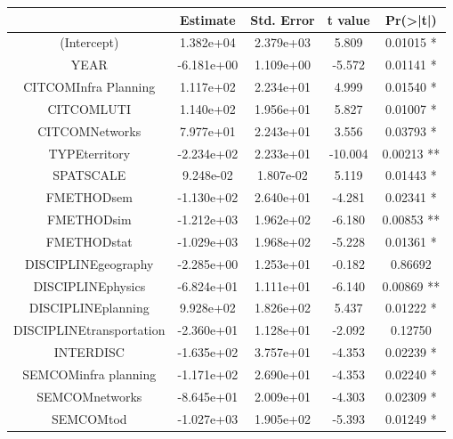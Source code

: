{\centering
\begin{tabular}{|c|c|c|c|c|}
\hline
 &     Estimate & Std. Error & t value & Pr(>|t|)   \\\hline
(Intercept)           &    1.382e+04 &  2.379e+03 &  5.809 & 0.01015 * \\
YEAR                   &  -6.181e+00 &  1.109e+00 & -5.572 & 0.01141 * \\
CITCOMInfra Planning   &   1.117e+02 &  2.234e+01 &  4.999 & 0.01540 * \\
CITCOMLUTI             &   1.140e+02 & 1.956e+01  & 5.827 & 0.01007 * \\
CITCOMNetworks         &   7.977e+01 & 2.243e+01 &  3.556 & 0.03793 * \\
TYPEterritory          &  -2.234e+02 & 2.233e+01 & -10.004 & 0.00213 ** \\
SPATSCALE              &   9.248e-02 & 1.807e-02 &  5.119 & 0.01443 * \\
FMETHODsem             &  -1.130e+02 & 2.640e+01 &  -4.281 & 0.02341 * \\
FMETHODsim             &  -1.212e+03 & 1.962e+02 & -6.180 & 0.00853 **\\
FMETHODstat            &  -1.029e+03 & 1.968e+02 & -5.228 & 0.01361 * \\
DISCIPLINEgeography    &  -2.285e+00 & 1.253e+01 & -0.182 & 0.86692   \\
DISCIPLINEphysics      &  -6.824e+01 & 1.111e+01 & -6.140 & 0.00869 **\\
DISCIPLINEplanning     &   9.928e+02 & 1.826e+02  & 5.437 & 0.01222 * \\
DISCIPLINEtransportation & -2.360e+01 & 1.128e+01 & -2.092 & 0.12750   \\
INTERDISC             &   -1.635e+02 & 3.757e+01 & -4.353 & 0.02239 * \\
SEMCOMinfra planning  &   -1.171e+02 & 2.690e+01 & -4.353 & 0.02240 * \\
SEMCOMnetworks        &   -8.645e+01 & 2.009e+01 & -4.303 & 0.02309 * \\
SEMCOMtod             &   -1.027e+03 & 1.905e+02 & -5.393 & 0.01249 * \\\hline
\end{tabular}
}




